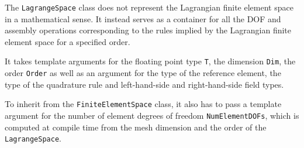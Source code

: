 The \texttt{LagrangeSpace} class does not represent the Lagrangian finite element space in a mathematical sense.
It instead serves as a container for all the DOF and assembly operations
corresponding to the rules implied by the Lagrangian finite element space for a specified order.

It takes template arguments for the floating point type \texttt{T}, the dimension \texttt{Dim},
the order \texttt{Order} as well as an argument for the type of the reference element,
the type of the quadrature rule and left-hand-side and right-hand-side field types.

To inherit from the \texttt{FiniteElementSpace} class, it also has to pass a template argument for the
number of element degrees of freedom \texttt{NumElementDOFs}, which is computed at compile
time from the mesh dimension and the order of the \texttt{LagrangeSpace}.
